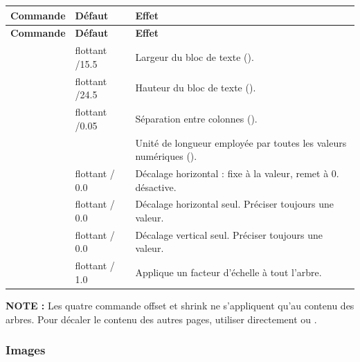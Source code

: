 \begin{longtable}{C T F}
\toprule
\textbf{Commande} & \textbf{Défaut} & \textbf{Effet} \\
\midrule
\endfirsthead
\toprule
\textbf{Commande} & \textbf{Défaut} & \textbf{Effet} \\
\midrule
\endhead
\bottomrule
\endfoot

  & flottant /15.5 & Largeur du bloc de texte (). \\
\addlinespace

 & flottant /24.5 & Hauteur du bloc de texte (). \\
\addlinespace

     & flottant /0.05 & Séparation entre colonnes (). \\
\addlinespace

       &  & Unité de longueur employée par toutes les valeurs
numériques (). \\
\addlinespace

     & flottant / 0.0 & Décalage horizontal : fixe
 à la valeur, remet  à 0.  désactive. \\
\addlinespace

    & flottant / 0.0 & Décalage horizontal seul.
Préciser toujours une valeur. \\
\addlinespace

    & flottant / 0.0 & Décalage vertical seul.
Préciser toujours une valeur. \\
\addlinespace

    & flottant / 1.0 & Applique un facteur d'échelle à tout l'arbre.
\end{longtable}

{\bf NOTE :} Les quatre commande offset et shrink ne s'appliquent qu'au contenu des arbres.
Pour décaler le contenu des autres pages, utiliser directement  ou
.

\subsubsection*{Images}

